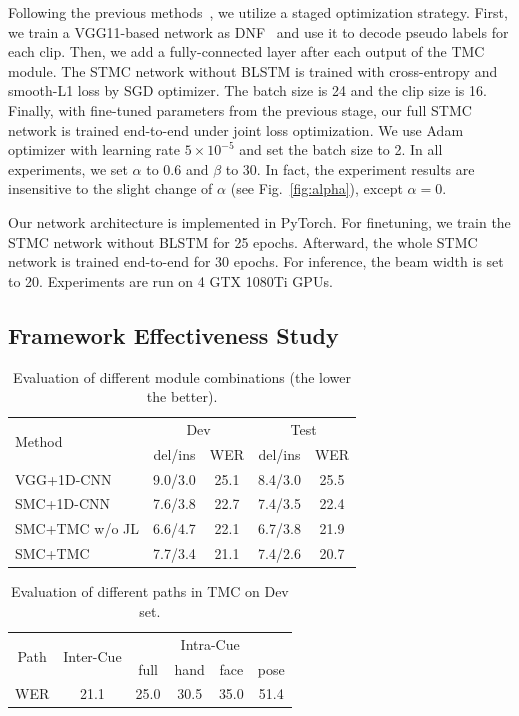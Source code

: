 \documentclass[letterpaper]{article} %
\begin{document}
Following the previous methods~\cite{resign,ian,cui-tmm19}, we utilize a staged optimization strategy. First, we train a VGG11-based network as DNF~\cite{cui-tmm19} and use it to decode pseudo labels for each clip. Then, we add a fully-connected layer after each output of the TMC module. The STMC network without BLSTM is trained with cross-entropy and smooth-L1 loss by SGD optimizer. The batch size is 24 and the clip size is 16. Finally, with fine-tuned parameters from the previous stage, our full STMC network is trained end-to-end under joint loss optimization. We use Adam optimizer with learning rate $5\times10^{-5}$ and set the batch size to 2. In all experiments, we set $\alpha$ to 0.6 and $\beta$ to 30. In fact, the experiment results are insensitive to the slight change of $\alpha$ (see Fig.~\ref{fig:alpha}), except $\alpha=0$.

Our network architecture is implemented in PyTorch. For finetuning, we train the STMC network without BLSTM for 25 epochs. Afterward, the whole STMC network is trained end-to-end for 30 epochs. For inference, the beam width is set to 20. Experiments are run on 4 GTX 1080Ti GPUs.


\subsection{Framework Effectiveness Study}
\begin{table}[tp]
    \centering
    \small
    \caption{Evaluation of different module combinations (the lower the better).} \label{tab:module}
    \begin{tabular}{l|cc|cc}
    \hline
    \multirow{2}{*}{Method} & \multicolumn{2}{c|}{Dev} & \multicolumn{2}{c}{Test} \\
                            & del/ins      & WER       & del/ins       & WER      \\ \hline
    VGG+1D-CNN              & 9.0/3.0      & 25.1      & 8.4/3.0       & 25.5     \\
    SMC+1D-CNN              & 7.6/3.8      & 22.7      & 7.4/3.5       & 22.4     \\
    SMC+TMC w/o JL          & 6.6/4.7      & 22.1      & 6.7/3.8       & 21.9     \\
    SMC+TMC                 & 7.7/3.4      & 21.1      & 7.4/2.6       & 20.7     \\ \hline
    \end{tabular}
\end{table}

\begin{table}[tp]
    \centering
    \small
    \caption{Evaluation of different paths in TMC on Dev set.} \label{tab:tmc}
    \begin{tabular*}{0.43\textwidth}{c|@{\extracolsep{\fill}}c|cccc}
    \hline
    \multirow{2}{*}{Path}&  \multirow{2}{*}{Inter-Cue} & \multicolumn{4}{c}{Intra-Cue}  \\ 
           &               & full     & hand   & face & pose \\ \hline
    WER &     21.1         & 25.0     & 30.5   & 35.0 & 51.4   \\ \hline
    \end{tabular*}
\end{table}
\end{document}
